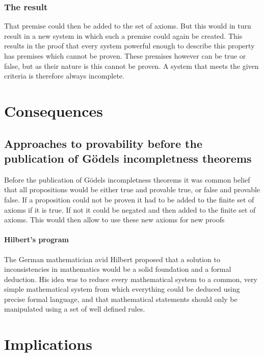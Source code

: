 \documentclass[english,12pt]{article}
\begin{document}
\subsubsection{The result}
That premise could then be added to the set of axioms. But this would in turn result in a new system in which such a premise could again be created. This results in the proof that every system powerful enough to describe this property has premises which cannot be proven. These premises however can be true or false, but as their nature is this cannot be proven. A system that meets the given criteria is therefore always incomplete.

\section{Consequences}
\subsection{Approaches to provability before the publication of Gödels incompletness theorems}
Before the publication of Gödels incompletness theorems it was common belief that all propositions would be either true and provable true, or false and provable false. If a proposition could not be proven it had to be added to the finite set of axioms if it is true. If not it could be negated and then added to the finite set of axioms. This would then allow to use these new axioms for new proofs\\
\paragraph{Hilbert's program}
The German mathematician avid Hilbert proposed that a solution to inconsistencies in mathematics would be a solid foundation and a formal deduction. His idea was to reduce every mathematical system to a common, very simple mathematical system from which everything could be deduced using precise formal language, and that mathematical statements should only be manipulated using a set of well defined rules.
\section{Implications}
\end{document}
